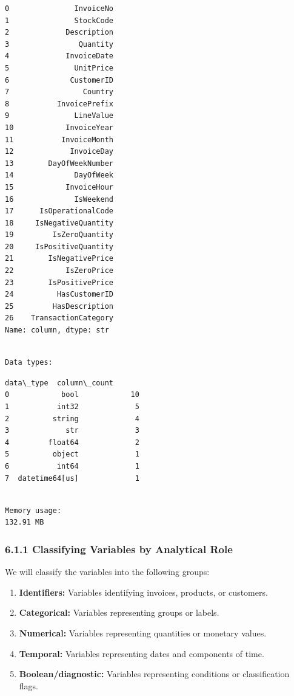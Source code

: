 \documentclass[11pt]{article}
\providecommand{\tightlist}{%
      \setlength{\itemsep}{0pt}\setlength{\parskip}{0pt}}
\begin{document}
    
    \begin{Verbatim}[commandchars=\\\{\}]
0               InvoiceNo
1               StockCode
2             Description
3                Quantity
4             InvoiceDate
5               UnitPrice
6              CustomerID
7                 Country
8           InvoicePrefix
9               LineValue
10            InvoiceYear
11           InvoiceMonth
12             InvoiceDay
13        DayOfWeekNumber
14              DayOfWeek
15            InvoiceHour
16              IsWeekend
17      IsOperationalCode
18     IsNegativeQuantity
19         IsZeroQuantity
20     IsPositiveQuantity
21        IsNegativePrice
22            IsZeroPrice
23        IsPositivePrice
24          HasCustomerID
25         HasDescription
26    TransactionCategory
Name: column, dtype: str
    \end{Verbatim}

    
    \begin{Verbatim}[commandchars=\\\{\}]

Data types:
    \end{Verbatim}

    
    \begin{Verbatim}[commandchars=\\\{\}]
        data\_type  column\_count
0            bool            10
1           int32             5
2          string             4
3             str             3
4         float64             2
5          object             1
6           int64             1
7  datetime64[us]             1
    \end{Verbatim}

    
    \begin{Verbatim}[commandchars=\\\{\}]

Memory usage:
132.91 MB
    \end{Verbatim}

    \subsubsection{6.1.1 Classifying Variables by Analytical
Role}\label{classifying-variables-by-analytical-role}

We will classify the variables into the following groups:

\begin{enumerate}
\def\labelenumi{\arabic{enumi}.}
\tightlist
\item
  \textbf{Identifiers:} Variables identifying invoices, products, or
  customers.
\item
  \textbf{Categorical:} Variables representing groups or labels.
\item
  \textbf{Numerical:} Variables representing quantities or monetary
  values.
\item
  \textbf{Temporal:} Variables representing dates and components of
  time.
\item
  \textbf{Boolean/diagnostic:} Variables representing conditions or
  classification flags.
\end{enumerate}
\end{document}
